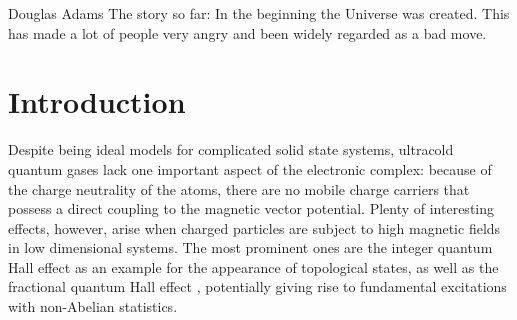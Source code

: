 \begin{tquote}{Douglas Adams}
    The story so far: In the beginning the Universe was created.
    This has made a lot of people very angry and been widely regarded as a bad move.
\end{tquote}

\chapter*{\vspace{4.55cm}Introduction} %

Despite being ideal models for complicated solid state systems, ultracold quantum gases lack one important aspect of the electronic complex: because of the charge neutrality of the atoms, there are no mobile charge carriers that possess a direct coupling to the magnetic vector potential. Plenty of interesting effects, however, arise when charged particles are subject to high magnetic fields in low dimensional systems. The most prominent ones are the integer quantum Hall effect \cite{Klitzing1980} as an example for the appearance of topological states, as well as the fractional quantum Hall effect \cite{Laughlin1983}, potentially giving rise to fundamental excitations with non-Abelian statistics.

